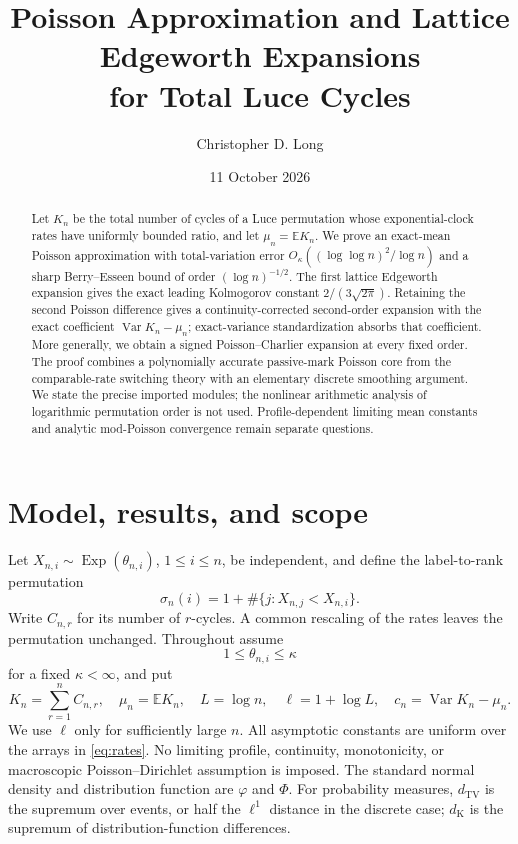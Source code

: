 \documentclass[11pt]{article}
\title{Poisson Approximation and Lattice Edgeworth Expansions\\for Total Luce Cycles}
\author{Christopher D. Long}
\date{11 October 2026}
\newcommand{\E}{\mathbb E}
\newcommand{\Var}{\operatorname{Var}}
\newcommand{\TV}{d_{\mathrm{TV}}}
\newcommand{\Kol}{d_{\mathrm K}}
\theoremstyle{remark}
\begin{document}
\maketitle
\begin{abstract}
Let $K_n$ be the total number of cycles of a Luce permutation whose exponential-clock rates have uniformly bounded ratio, and let $\mu_n=\E K_n$. We prove an exact-mean Poisson approximation with total-variation error $O_\kappa((\log\log n)^2/\log n)$ and a sharp Berry--Esseen bound of order $(\log n)^{-1/2}$. The first lattice Edgeworth expansion gives the exact leading Kolmogorov constant $2/(3\sqrt{2\pi})$. Retaining the second Poisson difference gives a continuity-corrected second-order expansion with the exact coefficient $\Var K_n-\mu_n$; exact-variance standardization absorbs that coefficient. More generally, we obtain a signed Poisson--Charlier expansion at every fixed order. The proof combines a polynomially accurate passive-mark Poisson core from the comparable-rate switching theory with an elementary discrete smoothing argument. We state the precise imported modules; the nonlinear arithmetic analysis of logarithmic permutation order is not used. Profile-dependent limiting mean constants and analytic mod-Poisson convergence remain separate questions.
\end{abstract}
\tableofcontents

\section{Model, results, and scope}
Let $X_{n,i}\sim\operatorname{Exp}(\theta_{n,i})$, $1\le i\le n$, be independent, and define the label-to-rank permutation
\[
 \sigma_n(i)=1+\#\{j:X_{n,j}<X_{n,i}\}.
\]
Write $C_{n,r}$ for its number of $r$-cycles. A common rescaling of the rates leaves the permutation unchanged. Throughout assume
\begin{equation}\label{eq:rates}
 1\le\theta_{n,i}\le\kappa
\end{equation}
for a fixed $\kappa<\infty$, and put
\[
 K_n=\sum_{r=1}^n C_{n,r},\quad \mu_n=\E K_n,\quad L=\log n,
 \quad \ell=1+\log L,\quad c_n=\Var K_n-\mu_n.
\]
We use $\ell$ only for sufficiently large $n$. All asymptotic constants are uniform over the arrays in \eqref{eq:rates}. No limiting profile, continuity, monotonicity, or macroscopic Poisson--Dirichlet assumption is imposed. The standard normal density and distribution function are $\varphi$ and $\Phi$. For probability measures, $\TV$ is the supremum over events, or half the $\ell^1$ distance in the discrete case; $\Kol$ is the supremum of distribution-function differences.
\end{document}
